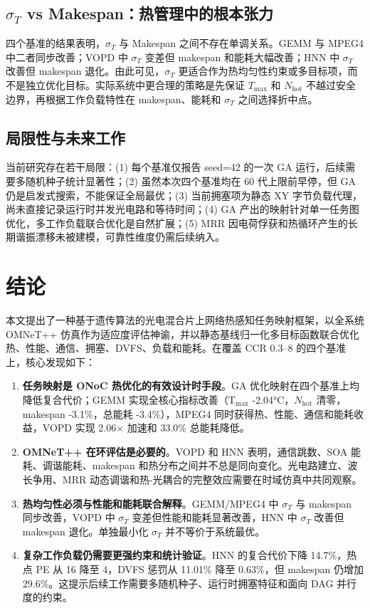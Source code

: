 \documentclass[conference]{IEEEtran}
\begin{document}
\subsection{$\sigma_T$ vs Makespan：热管理中的根本张力}

四个基准的结果表明，$\sigma_T$ 与 Makespan 之间不存在单调关系。GEMM 与 MPEG4 中二者同步改善；VOPD 中 $\sigma_T$ 变差但 makespan 和能耗大幅改善；HNN 中 $\sigma_T$ 改善但 makespan 退化。由此可见，$\sigma_T$ 更适合作为热均匀性约束或多目标项，而不是独立优化目标。实际系统中更合理的策略是先保证 $T_{\max}$ 和 $N_{\text{hot}}$ 不越过安全边界，再根据工作负载特性在 makespan、能耗和 $\sigma_T$ 之间选择折中点。

\subsection{局限性与未来工作}

当前研究存在若干局限：(1) 每个基准仅报告 seed=42 的一次 GA 运行，后续需要多随机种子统计显著性；(2) 虽然本次四个基准均在 60 代上限前早停，但 GA 仍是启发式搜索，不能保证全局最优；(3) 当前拥塞项为静态 XY 字节负载代理，尚未直接记录运行时并发光电路和等待时间；(4) GA 产出的映射针对单一任务图优化，多工作负载联合优化是自然扩展；(5) MRR 因电荷俘获和热循环产生的长期谐振漂移未被建模，可靠性维度仍需后续纳入。

\section{结论}

本文提出了一种基于遗传算法的光电混合片上网络热感知任务映射框架，以全系统 OMNeT++ 仿真作为适应度评估神谕，并以静态基线归一化多目标函数联合优化热、性能、通信、拥塞、DVFS、负载和能耗。在覆盖 CCR 0.3--8 的四个基准上，核心发现如下：

\begin{enumerate}
\item \textbf{任务映射是 ONoC 热优化的有效设计时手段}。GA 优化映射在四个基准上均降低复合代价；GEMM 实现全核心指标改善（T$_{\max}$ -2.04\si{\degreeCelsius}，$N_{\text{hot}}$ 清零，makespan -3.1\%，总能耗 -3.4\%），MPEG4 同时获得热、性能、通信和能耗收益，VOPD 实现 2.06$\times$ 加速和 33.0\% 总能耗降低。

\item \textbf{OMNeT++ 在环评估是必要的}。VOPD 和 HNN 表明，通信跳数、SOA 能耗、调谐能耗、makespan 和热分布之间并不总是同向变化。光电路建立、波长争用、MRR 动态调谐和热-光耦合的完整效应需要在时域仿真中共同观察。

\item \textbf{热均匀性必须与性能和能耗联合解释}。GEMM/MPEG4 中 $\sigma_T$ 与 makespan 同步改善，VOPD 中 $\sigma_T$ 变差但性能和能耗显著改善，HNN 中 $\sigma_T$ 改善但 makespan 退化。单独最小化 $\sigma_T$ 并不等价于系统最优。

\item \textbf{复杂工作负载仍需要更强约束和统计验证}。HNN 的复合代价下降 14.7\%，热点 PE 从 16 降至 4，DVFS 惩罚从 11.01\% 降至 0.63\%，但 makespan 仍增加 29.6\%。这提示后续工作需要多随机种子、运行时拥塞特征和面向 DAG 并行度的约束。
\end{enumerate}
\end{document}
